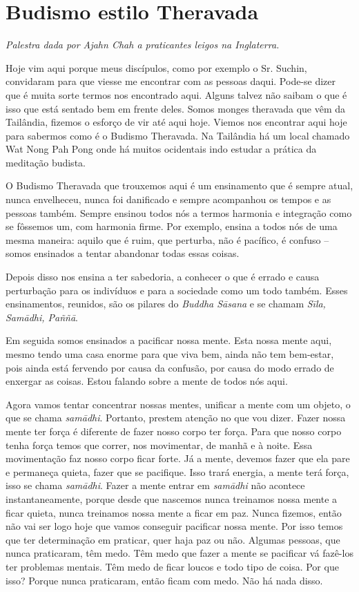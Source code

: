
\chapter{Budismo estilo Theravada}

{\itshape
Palestra dada por Ajahn Chah a praticantes leigos na Inglaterra.}

Hoje vim aqui porque meus discípulos, como por exemplo o Sr. Suchin,
convidaram para que viesse me encontrar com as pessoas daqui. Pode-se
dizer que é muita sorte termos nos encontrado aqui. Alguns talvez não
saibam o que é isso que está sentado bem em frente deles. Somos monges
theravada que vêm da Tailândia, fizemos o esforço de vir até aqui hoje.
Viemos nos encontrar aqui hoje para sabermos como é o Budismo
Theravada. Na Tailândia há um local chamado Wat Nong Pah Pong onde há
muitos ocidentais indo estudar a prática da meditação budista. 

O Budismo Theravada que trouxemos aqui é um ensinamento que é sempre
atual, nunca envelheceu, nunca foi danificado e sempre acompanhou os
tempos e as pessoas também. Sempre ensinou todos nós a termos harmonia
e integração como se fôssemos um, com harmonia firme. Por exemplo,
ensina a todos nós de uma mesma maneira: aquilo que é ruim, que
perturba, não é pacífico, é confuso – somos ensinados a tentar
abandonar todas essas coisas. 

Depois disso nos ensina a ter sabedoria, a conhecer o que é errado e
causa perturbação para os indivíduos e para a sociedade como um todo
também. Esses ensinamentos, reunidos, são os pilares do \textit{Buddha
Sāsana} e se chamam \textit{Sīla, Samādhi, Paññā}.

Em seguida somos ensinados a pacificar nossa mente. Esta nossa mente
aqui, mesmo tendo uma casa enorme para que viva bem, ainda não tem
bem-estar, pois ainda está fervendo por causa da confusão, por causa do
modo errado de enxergar as coisas. Estou falando sobre a mente de todos
nós aqui.

Agora vamos tentar concentrar nossas mentes, unificar a mente com um
objeto, o que se chama \textit{samādhi}. Portanto, prestem atenção no
que vou dizer. Fazer nossa mente ter força é diferente de fazer nosso
corpo ter força. Para que nosso corpo tenha força temos que correr, nos
movimentar, de manhã e à noite. Essa movimentação faz nosso corpo ficar
forte. Já a mente, devemos fazer que ela pare e permaneça quieta, fazer
que se pacifique. Isso trará energia, a mente terá força, isso se chama
\textit{samādhi}. Fazer a mente entrar em \textit{samādhi} não
acontece instantaneamente, porque desde que nascemos nunca treinamos
nossa mente a ficar quieta, nunca treinamos nossa mente a ficar em paz.
Nunca fizemos, então não vai ser logo hoje que vamos conseguir
pacificar nossa mente. Por isso temos que ter determinação em praticar,
quer haja paz ou não. Algumas pessoas, que nunca praticaram, têm medo.
Têm medo que fazer a mente se pacificar vá fazê-los ter problemas
mentais. Têm medo de ficar loucos e todo tipo de coisa. Por que isso?
Porque nunca praticaram, então ficam com medo. Não há nada disso. 

